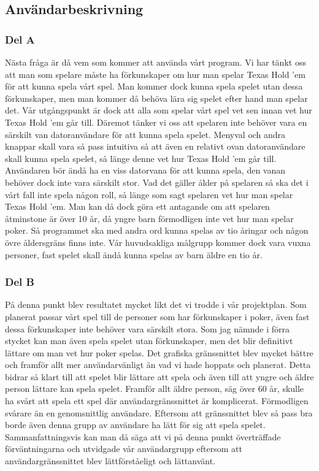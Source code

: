 \documentclass[10pt,a4paper]{article}
\begin{document}
\subsection*{Användarbeskrivning}

\subsubsection*{Del A}

Nästa fråga är då vem som kommer att använda vårt program. Vi har tänkt oss
att man som spelare måste ha förkunskaper om hur man spelar Texas Hold ’em
för att kunna spela vårt spel. Man kommer dock kunna spela spelet utan
dessa förkunskaper, men man kommer då behöva lära sig spelet efter hand man
spelar det. Vår utgångspunkt är dock att alla som spelar vårt spel vet sen
innan vet hur Texas Hold ’em går till. Däremot tänker vi oss att spelaren
inte behöver vara en särskilt van datoranvändare för att kunna spela
spelet. Menyval och andra knappar skall vara så pass intuitiva så att även
en relativt ovan datoranvändare skall kunna spela spelet, så länge denne
vet hur Texas Hold ’em går till. Användaren bör ändå ha en viss datorvana
för att kunna spela, den vanan behöver dock inte vara särskilt stor. Vad
det gäller ålder på spelaren så ska det i vårt fall inte spela någon roll,
så länge som sagt spelaren vet hur man spelar Texas Hold ’em. Man kan då
dock göra ett antagande om att spelaren åtminstone är över 10 år, då yngre
barn förmodligen inte vet hur man spelar poker. Så programmet ska med andra
ord kunna spelas av tio åringar och någon övre åldersgräns finns inte. Vår
huvudsakliga målgrupp kommer dock vara vuxna personer, fast spelet skall
ändå kunna spelas av barn äldre en tio år.

\subsubsection*{Del B}

På denna punkt blev resultatet mycket likt det vi trodde i vår projektplan. Som planerat passar vårt spel till de personer som har förkunskaper i poker, även fast dessa förkunskaper inte behöver vara särskilt stora. Som jag nämnde i förra stycket kan man även spela spelet utan förkunskaper, men det blir definitivt lättare om man vet hur poker spelas. Det grafiska gränssnittet blev mycket bättre och framför allt mer användarvänligt än vad vi hade hoppats och planerat. Detta bidrar så klart till att spelet blir lättare att spela och även till att yngre och äldre person lättare kan spela spelet. Framför allt äldre person, säg över 60 år, skulle ha svårt att spela ett spel där användargränssnittet är komplicerat. Förmodligen svårare än en genomsnittlig användare. Eftersom att gränssnittet blev så pass bra borde även denna grupp av användare ha lätt för sig att spela spelet. Sammanfattningsvis kan man då säga att vi på denna punkt överträffade förväntningarna och utvidgade vår användargrupp eftersom att användargränssnittet blev lättförståeligt och lättanvänt.
\end{document}
